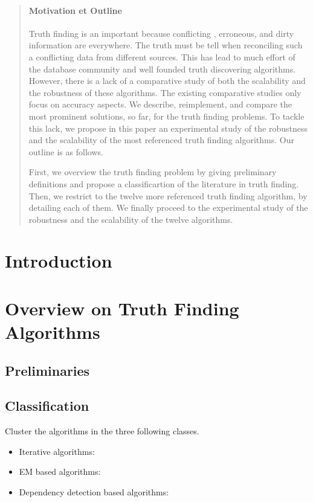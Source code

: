 \documentclass{vldb}
\begin{document}
\begin{abstract}
\paragraph*{Motivation et Outline} Truth finding is an important because conflicting , erroneous, and dirty
information are everywhere. The truth must be tell when reconciling such a conflicting data from different sources. 
This has lead to much effort of the database community and well founded truth discovering algorithms. However, there 
is a lack of a comparative study of both the scalability and the robustness of these algorithms. The existing comparative 
studies only focus on accuracy aspects. We describe, reimplement, and compare the most prominent solutions, so far, 
for the truth finding problems. To tackle this lack, we propose in this paper an experimental study of the robustness
and the scalability of the most referenced truth finding algorithms.  Our outline is as follows.


First, we overview the truth finding problem by giving preliminary definitions and propose a classificartion of the literature
in truth finding. Then, we restrict to the twelve more referenced truth finding algorithm, by detailing each of them. We finally
proceed to the experimental study of the robustness and the scalability of the twelve algorithms.
\end{abstract}
\section{Introduction}

\section{Overview on Truth Finding Algorithms}

\subsection{Preliminaries}

\subsection{Classification}
Cluster the algorithms in the three following classes.
\begin{itemize}
 \item Iterative algorithms:
 \item EM based algorithms:
 \item Dependency detection based algorithms:
\end{itemize}
\end{document}
